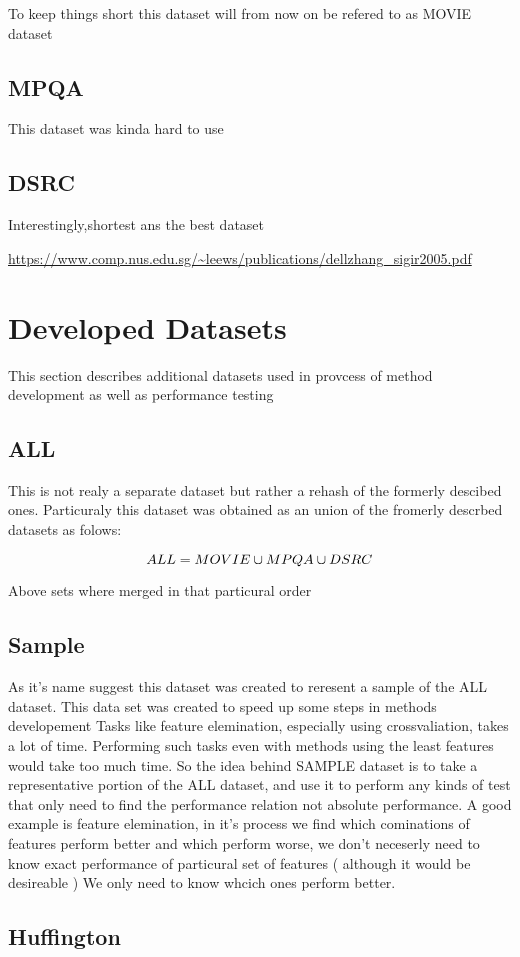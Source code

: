 %

To keep things short this dataset will from now on be refered to as MOVIE dataset


\subsection{ MPQA }

This dataset was kinda hard to use

\subsection{ DSRC }

Interestingly,shortest ans the best dataset

\url{https://www.comp.nus.edu.sg/~leews/publications/dellzhang_sigir2005.pdf}

\section{ Developed Datasets }

This section describes additional datasets used in provcess of method development as well as performance testing

\subsection{ ALL }

This is not realy a separate dataset but rather a rehash of the formerly descibed ones. 
Particuraly this dataset was obtained as an union of the fromerly descrbed datasets as folows:

\begin{displaymath}
\centering
ALL = MOVIE \cup MPQA \cup DSRC
\end{displaymath}

Above sets where merged in that particural order


\subsection{ Sample }

As it's name suggest this dataset was created to reresent a sample of the ALL dataset. This data set was created to speed up some steps in methods developement
Tasks like feature elemination, especially using crossvaliation, takes a lot of time. Performing such tasks even with methods using the least features would
take too much time. So the idea behind SAMPLE dataset is to take a representative portion of the ALL dataset, and use it to perform any kinds of test that 
only need to find the performance relation not absolute performance. A good example is feature elemination, in it's process we find which cominations of features
perform better and which perform worse, we don't neceserly need to know exact performance of particural set of features ( although it would be desireable ) We only
need to know whcich ones perform better. 



\subsection{ Huffington }